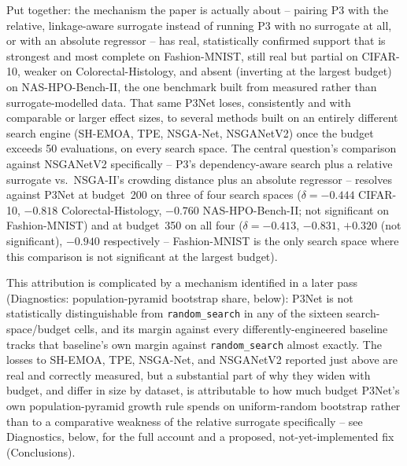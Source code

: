 Put together: the mechanism the paper is actually about -- pairing P3 with the relative, linkage-aware
surrogate instead of running P3 with no surrogate at all, or with an absolute regressor -- has real,
statistically confirmed support that is strongest and most complete on Fashion-MNIST, still real but partial
on CIFAR-10, weaker on Colorectal-Histology, and absent (inverting at the largest budget) on
NAS-HPO-Bench-II, the one benchmark built from measured rather than surrogate-modelled data. That same
P3Net loses, consistently and with comparable or larger effect sizes, to several methods built on an
entirely different search engine (SH-EMOA, TPE, NSGA-Net, NSGANetV2) once the budget exceeds 50 evaluations,
on every search space. The central question's comparison against NSGANetV2 specifically -- P3's
dependency-aware search plus a relative surrogate vs.\ NSGA-II's crowding distance plus an absolute
regressor -- resolves against P3Net at budget~200 on three of four search spaces ($\delta=-0.444$ CIFAR-10,
$-0.818$ Colorectal-Histology, $-0.760$ NAS-HPO-Bench-II; not significant on Fashion-MNIST) and at
budget~350 on all four ($\delta=-0.413$, $-0.831$, $+0.320$ (not significant), $-0.940$ respectively --
Fashion-MNIST is the only search space where this comparison is not significant at the largest budget).

This attribution is complicated by a mechanism identified in a later pass (Diagnostics: population-pyramid
bootstrap share, below): P3Net is not statistically distinguishable from \texttt{random\_search} in any of
the sixteen search-space/budget cells, and its margin against every differently-engineered baseline tracks
that baseline's own margin against \texttt{random\_search} almost exactly. The losses to SH-EMOA, TPE,
NSGA-Net, and NSGANetV2 reported just above are real and correctly measured, but a substantial part of why
they widen with budget, and differ in size by dataset, is attributable to how much budget P3Net's own
population-pyramid growth rule spends on uniform-random bootstrap rather than to a comparative weakness of
the relative surrogate specifically -- see Diagnostics, below, for the full account and a proposed,
not-yet-implemented fix (Conclusions).

